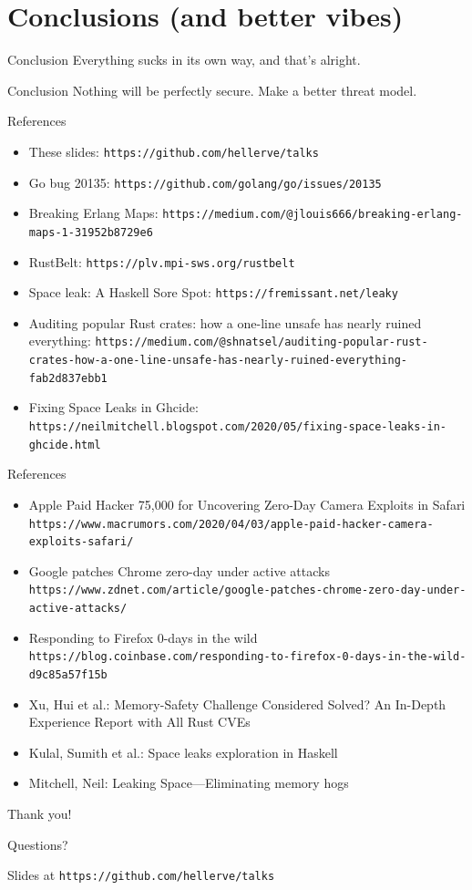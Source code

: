 \documentclass[aspectratio=169,14pt]{beamer}
\begin{document}
  \section{Conclusions (and better vibes)}
  \begin{frame}{Conclusion}
    Everything sucks in its own way, and that’s alright.
  \end{frame}
  \begin{frame}{Conclusion}
    Nothing will be perfectly secure. Make a better threat model.
  \end{frame}
  \begin{frame}{References}
    \begin{itemize}
      \item These slides: \texttt{https://github.com/hellerve/talks}
      \item Go bug 20135: \texttt{https://github.com/golang/go/issues/20135}
      \item Breaking Erlang Maps: \texttt{https://medium.com/@jlouis666/breaking-erlang-maps-1-31952b8729e6}
      \item RustBelt: \texttt{https://plv.mpi-sws.org/rustbelt}
      \item Space leak: A Haskell Sore Spot: \texttt{https://fremissant.net/leaky}
      \item Auditing popular Rust crates: how a one-line unsafe has nearly ruined everything: \texttt{https://medium.com/@shnatsel/auditing-popular-rust-crates-how-a-one-line-unsafe-has-nearly-ruined-everything-fab2d837ebb1}
      \item Fixing Space Leaks in Ghcide: \texttt{https://neilmitchell.blogspot.com/2020/05/fixing-space-leaks-in-ghcide.html}
    \end{itemize}
  \end{frame}
  \begin{frame}{References}
    \begin{itemize}
      \item Apple Paid Hacker 75,000 for Uncovering Zero-Day Camera Exploits in Safari \texttt{https://www.macrumors.com/2020/04/03/apple-paid-hacker-camera-exploits-safari/}
      \item Google patches Chrome zero-day under active attacks \texttt{https://www.zdnet.com/article/google-patches-chrome-zero-day-under-active-attacks/}
      \item Responding to Firefox 0-days in the wild \texttt{https://blog.coinbase.com/responding-to-firefox-0-days-in-the-wild-d9c85a57f15b}
      \item Xu, Hui et al.: Memory-Safety Challenge Considered Solved? An In-Depth Experience Report with All Rust CVEs
      \item Kulal, Sumith et al.: Space leaks exploration in Haskell
      \item Mitchell, Neil: Leaking Space—Eliminating memory hogs
    \end{itemize}
  \end{frame}
  \begin{frame}{}
    Thank you!

    \bigskip

    Questions?

    \bigskip

    \tiny Slides at \texttt{https://github.com/hellerve/talks}
  \end{frame}
\end{document}
